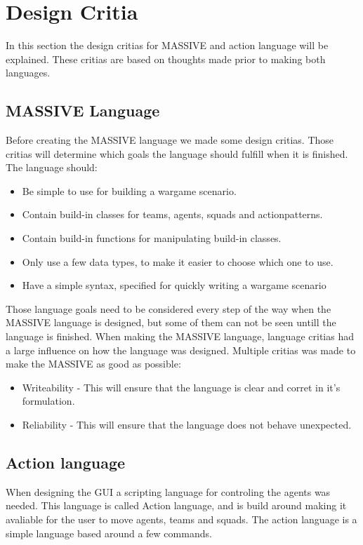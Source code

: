 \section{Design Critia}
\label{sec:designcrit}
In this section the design critias for MASSIVE and action language will be explained. These critias are based on thoughts made prior to making both languages.

\subsection{MASSIVE Language}
Before creating the MASSIVE language we made some design critias. Those critias will determine which goals the language should fulfill when it is finished. The language should:

\begin{itemize}
	\item Be simple to use for building a wargame scenario.
	\item Contain build-in classes for teams, agents, squads and actionpatterns.
	\item Contain build-in functions for manipulating build-in classes.
	\item Only use a few data types, to make it easier to choose which one to use.
	\item Have a simple syntax, specified for quickly writing a wargame scenario
\end{itemize}

Those language goals need to be considered every step of the way when the MASSIVE language is designed, but some of them can not be seen untill the language is finished.
When making the MASSIVE language, language critias had a large influence on how the language was designed. Multiple critias was made to make the MASSIVE as good as possible:

\begin{itemize}
	\item Writeability - This will ensure that the language is clear and corret in it's formulation.
	\item Reliability - This will ensure that the language does not behave unexpected.
\end{itemize}

\subsection{Action language}
When designing the GUI a scripting language for controling the agents was needed. This language is called Action language, and is build around making it avaliable for the user to move agents, teams and squads.
The action language is a simple language based around a few commands.

